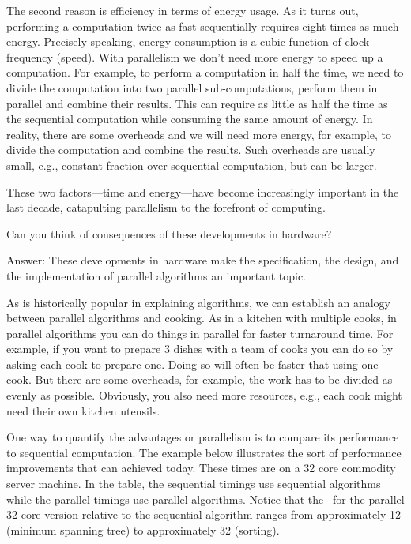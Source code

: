 The second reason is efficiency in terms of energy usage.
%
As it turns out, performing a computation twice as fast sequentially
requires eight times as much energy.  
%
Precisely speaking, energy
consumption is a cubic function of clock frequency (speed).  With
parallelism we don't need more energy to speed up a computation. 
%
For example, to perform a computation in half the time, we need to
divide the computation into two parallel sub-computations, perform
them in parallel and combine their results.  This can require as
little as half the time as the sequential computation while consuming
the same amount of energy.
%
In reality, there are some overheads and we will need more energy, for
example, to divide the computation and combine the results.
Such overheads are usually small, e.g., constant fraction over
sequential computation, but can be larger. 

These two factors---time and energy---have become increasingly
important in the last decade, catapulting parallelism to the forefront
of computing.

Can you think of consequences of these developments in hardware?  

Answer:
These developments in hardware make the specification, the design, and
the implementation of parallel algorithms an important topic.


As is historically popular in explaining algorithms, we can establish
an analogy between parallel algorithms and cooking.  As in a kitchen
with multiple cooks, in parallel algorithms you can do things in
parallel for faster turnaround time.  For example, if you want to
prepare 3 dishes with a team of cooks you can do so by asking each
cook to prepare one.
%
Doing so will often be faster that using one cook.  But there are some
overheads, for example, the work has to be divided as evenly as
possible.  Obviously, you also need more resources, e.g., each cook
might need their own kitchen utensils.

One way to quantify the advantages or parallelism is to compare
its performance to sequential computation.
%
The example below illustrates the sort of performance improvements
that can achieved today.  
%
%
These times are on a 32 core commodity
server machine.  In the table, the sequential timings use sequential
algorithms while the parallel timings use parallel algorithms.  Notice
that the~ for the parallel 32 core version relative to
the sequential algorithm ranges from approximately 12 (minimum
spanning tree) to approximately 32 (sorting).

